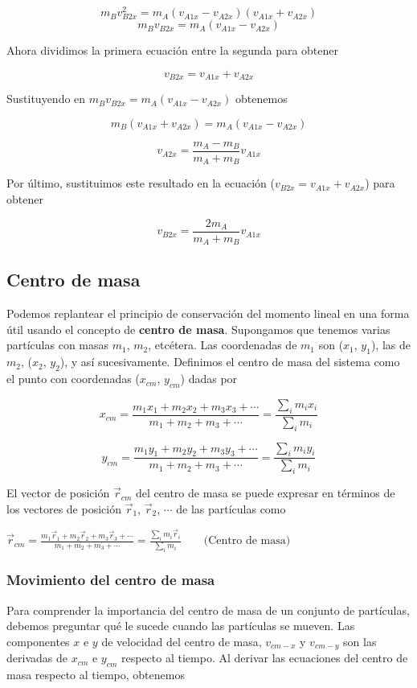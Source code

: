 \documentclass{article}
\newcommand{\newsubsection}[1]{
    \vspace{0.5cm}
    \color{sectionColor}
    \subsection{\bl{#1}}
    \color{black}
    \vspace{0.5cm}
}
\newcommand{\newtitle}[1]{
    \color{titleColor}
    \subsubsection{#1}
    \color{black}
}
\newcommand{\bl}[1]{\textbf{#1}}
\newcommand{\definicion}[1]{%
    \vspace{0.5cm}
    \begin{definicionbox}
        #1
    \end{definicionbox}
    \vspace{0.5cm}
}
\begin{document}
    \[ m_B v_{B2x}^2 = m_A (v_{A1x} - v_{A2x})(v_{A1x} + v_{A2x}) \]
    \[ m_B v_{B2x} = m_A (v_{A1x} - v_{A2x}) \]

    \par Ahora dividimos la primera ecuación entre la segunda para obtener

    \[ v_{B2x} = v_{A1x} + v_{A2x} \]

    \par Sustituyendo en $m_B v_{B2x} = m_A (v_{A1x} - v_{A2x})$ obtenemos

    \[ m_B (v_{A1x} + v_{A2x}) = m_A (v_{A1x} - v_{A2x}) \]

    \[ v_{A2x} = \frac{m_A - m_B}{m_A + m_B} v_{A1x} \]

    \par Por último, sustituimos este resultado en la ecuación ($v_{B2x} = v_{A1x} + v_{A2x}$) para obtener

    \[ v_{B2x} = \frac{2 m_A}{m_A + m_B} v_{A1x} \]

    \newsubsection{Centro de masa}

    \par Podemos replantear el principio de conservación del momento lineal en una forma útil usando el concepto de \bl{centro de masa}. Supongamos que tenemos varias partículas con masas $m_1$, $m_2$, etcétera. Las coordenadas de $m_1$ son ($x_1$, $y_1$), las de $m_2$, ($x_2$, $y_2$), y así sucesivamente. Deﬁnimos el centro de masa del sistema como el punto con coordenadas ($x_{cm}$, $y_{cm}$) dadas por

    \[ x_{cm} = \frac{m_1 x_1 + m_2 x_2 + m_3 x_3 + \cdots}{m_1 + m_2 + m_3 + \cdots} = \frac{\sum_{i}^{} m_i x_i}{\sum_{i}^{} m_i} \]

    \[ y_{cm} = \frac{m_1 y_1 + m_2 y_2 + m_3 y_3 + \cdots}{m_1 + m_2 + m_3 + \cdots} = \frac{\sum_{i}^{} m_i y_i}{\sum_{i}^{} m_i} \]

    \par El vector de posición $\vec{r}_{cm}$ del centro de masa se puede expresar en términos de los vectores de posición $\vec{r}_1$, $\vec{r}_2$, $\cdots$ de las partículas como

    \definicion{
        \centering
        \( \vec{r}_{cm} = \frac{m_1 \vec{r}_1 + m_2 \vec{r}_2 + m_3 \vec{r}_3 + \cdots}{m_1 + m_2 + m_3 + \cdots} = \frac{\sum_{i}^{} m_i \vec{r}_i}{\sum_{i}^{} m_i} \quad \quad \text{(Centro de masa)} \)
    }

    \newtitle{Movimiento del centro de masa}

    \par Para comprender la importancia del centro de masa de un conjunto de partículas, debemos preguntar qué le sucede cuando las partículas se mueven. Las componentes $x$ e $y$ de velocidad del centro de masa, $v_{cm-x}$ y $v_{cm-y}$ son las derivadas de $x_{cm}$ e $y_{cm}$ respecto al tiempo. Al derivar las ecuaciones del centro de masa respecto al tiempo, obtenemos
\end{document}
